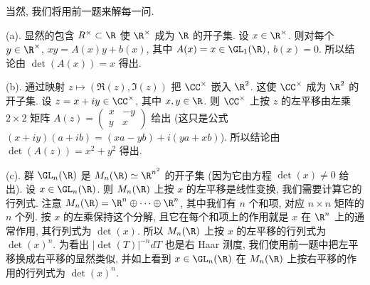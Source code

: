 \begin{solution}
当然, 我们将用前一题来解每一问.

(a). 显然的包含 $R^{\times} \subset \R$ 使 $\R^{\times}$ 成为 $\R$ 的开子集. 设 $x \in \R^{\times}$. 则对每个 $y \in \R^{\times}$, $xy = A(x)y + b(x)$, 其中 $A(x) = x \in \GL_1(\R)$, $b(x) = 0$. 所以结论由 $\det(A(x)) = x$ 得出.

(b). 通过映射 $z \longmapsto (\Re(z), \Im(z))$ 把 $\CC^{\times}$ 嵌入 $\R^2$. 这使 $\CC^{\times}$ 成为 $\R^2$ 的开子集. 设 $z = x + iy \in \CC^{\times}$, 其中 $x, y \in \R$. 则 $\CC^{\times}$ 上按 $z$ 的左平移由左乘 $2 \times 2$ 矩阵 $A(z) = \begin{pmatrix} x & -y \\ y & x \end{pmatrix}$ 给出 (这只是公式 $(x + iy)(a + ib) = (xa - yb) + i(ya + xb)$). 所以结论由 $\det(A(z)) = x^2 + y^2$ 得出.

(c). 群 $\GL_n(\R)$ 是 $M_n(\R) \simeq \R^{n^2}$ 的开子集 (因为它由方程 $\det(x) \neq 0$ 给出). 设 $x \in \GL_n(\R)$. 则 $M_n(\R)$ 上按 $x$ 的左平移是线性变换, 我们需要计算它的行列式. 注意 $M_n(\R) = \R^n \oplus \cdots \oplus \R^n$, 其中我们有 $n$ 个和项, 对应 $n \times n$ 矩阵的 $n$ 个列. 按 $x$ 的左乘保持这个分解, 且它在每个和项上的作用就是 $x$ 在 $\R^n$ 上的通常作用, 其行列式为 $\det(x)$. 所以 $M_n(\R)$ 上按 $x$ 的左平移的行列式为 $\det(x)^n$.
为看出 $|\det(T)|^{-n}dT$ 也是右 Haar 测度, 我们使用前一题中把左平移换成右平移的显然类似, 并如上看到 $x \in \GL_n(\R)$ 在 $M_n(\R)$ 上按右平移的作用的行列式为 $\det(x)^n$.


\end{solution}
